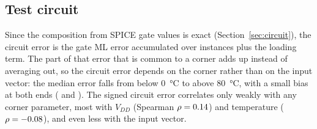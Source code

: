 \subsection{Test circuit}\label{sec:errcircuit}
Since the composition from SPICE gate values is exact (Section~\ref{sec:circuit}), the circuit
error is the gate ML error accumulated over \CircuitNumGates{} instances plus the loading term.
The part of that error that is common to a corner adds up instead of averaging out, so the
circuit error depends on the corner rather than on the input vector: the median error falls from
\CircuitColdMedianErr{} below \qty{0}{\degreeCelsius} to \CircuitHotMedianErr{} above
\qty{80}{\degreeCelsius}, with a small bias at both ends (\CircuitColdBias{} and
\CircuitHotBias). The signed circuit error correlates only weakly with any corner parameter, most
with $V_{DD}$ (Spearman $\rho=\num{0.14}$) and temperature ($\rho=\num{-0.08}$), and even
less with the input vector.
